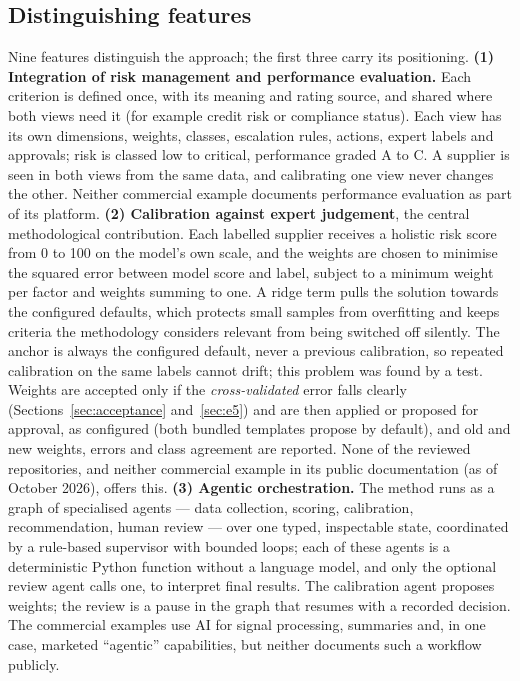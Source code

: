 \documentclass[10pt,twocolumn,a4paper]{article}
\begin{document}
\subsection{Distinguishing features}
Nine features distinguish the approach; the first three carry its positioning.
\textbf{(1) Integration of risk management and performance evaluation.} Each criterion
is defined once, with its meaning and rating source, and shared where both views need it
(for example credit risk or compliance status). Each view has its own dimensions,
weights, classes, escalation rules, actions, expert labels and approvals; risk is classed
low to critical, performance graded A to C. A supplier is seen in both views from the same
data, and calibrating one view never changes the other. Neither commercial example
documents performance evaluation as part of its platform.
\textbf{(2) Calibration against expert judgement}, the central methodological
contribution. Each
labelled supplier receives a holistic risk score from 0 to 100 on the model's own scale,
and the weights are chosen to minimise the squared error between model score and label,
subject to a minimum weight per factor and weights summing to one. A ridge term pulls the
solution towards the configured defaults, which protects small samples from overfitting
and keeps criteria the methodology considers relevant from being switched off silently.
The anchor is always the configured default, never a previous calibration, so repeated
calibration on the same labels cannot drift; this problem was found by a test. Weights
are accepted only if the \emph{cross-validated} error falls clearly
(Sections~\ref{sec:acceptance} and~\ref{sec:e5}) and are then applied or proposed for
approval, as configured (both bundled templates propose by default), and old and new weights, errors and
class agreement are reported. None of the reviewed repositories, and neither commercial
example in its public documentation (as of October 2026), offers this.
\textbf{(3) Agentic orchestration.} The method runs as a graph of specialised agents ---
data collection, scoring, calibration, recommendation, human review --- over one typed,
inspectable state, coordinated by a rule-based supervisor with bounded loops; each of
these agents is a deterministic Python function without a language model, and only the
optional review agent calls one, to interpret final results. The calibration agent
proposes weights; the review is a pause in the graph that resumes with a recorded
decision. The commercial examples use AI for signal processing, summaries and, in one
case, marketed ``agentic'' capabilities, but neither documents such a workflow publicly.
\end{document}
